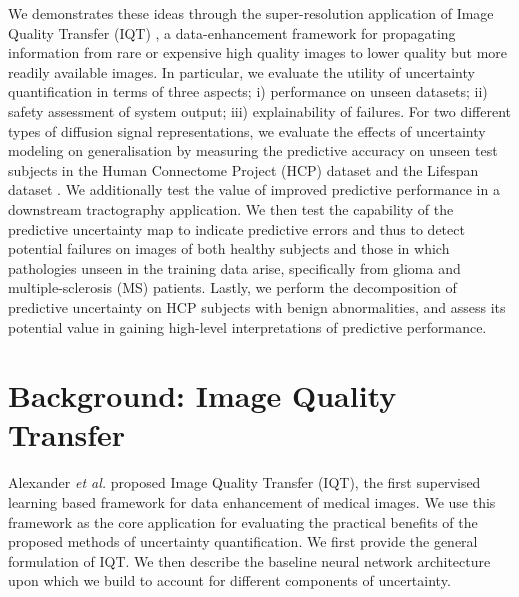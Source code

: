 We demonstrates these ideas through the super-resolution application of Image Quality Transfer (IQT) \cite{alexander2014image,tanno2016bayesian,alexander2017image,blumberg2018deeper}, a data-enhancement framework for propagating information from rare or expensive high quality images to lower quality but more readily available images. In particular, we evaluate the utility of uncertainty quantification in terms of three aspects; i) performance on unseen datasets; ii) safety assessment of system output; iii) explainability of failures. For two different types of diffusion signal representations, we evaluate the effects of uncertainty modeling on generalisation by measuring the predictive accuracy on unseen test subjects in the Human Connectome Project (HCP) dataset \cite{sotiropoulos2013advances} and the Lifespan dataset \cite{harms2018extending}. We additionally test the value of improved predictive performance in a downstream tractography application. We then test the capability of the predictive uncertainty map to indicate predictive errors and thus to detect potential failures on images of both healthy subjects and those in which pathologies unseen in the training data arise, specifically from glioma and multiple-sclerosis (MS) patients. Lastly, we perform the decomposition of predictive uncertainty on HCP subjects with benign abnormalities, and assess its potential value in gaining high-level interpretations of predictive performance. 



\section{Background: Image Quality Transfer}
Alexander \emph{et al.} \cite{alexander2014image} proposed Image Quality Transfer (IQT), the first supervised learning based framework for data enhancement of medical images. We use this framework as the core application for evaluating the practical benefits of the proposed methods of uncertainty quantification. We first provide the general formulation of IQT. We then describe the baseline neural network architecture upon which we build to account for different components of uncertainty. 

